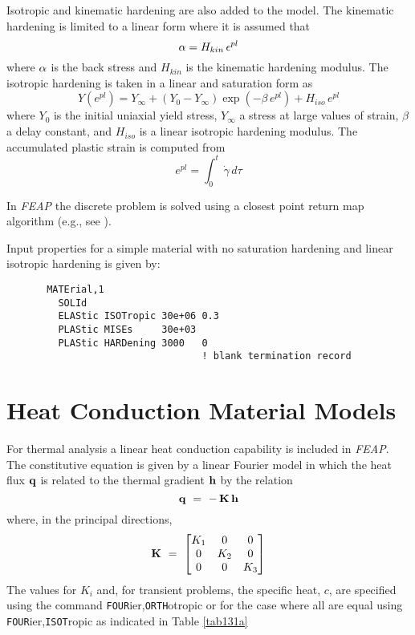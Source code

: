 Isotropic and kinematic hardening are also added to the model.  The kinematic
hardening is limited to a linear form where it is assumed that
\begin{equation}
\mathbf{\alpha} = H_{kin} \, \mathbf{\epsilon}^{pl}
\end{equation}
where $\mathbf{\alpha}$ is the back stress and $H_{kin}$ is the kinematic hardening
modulus.  The isotropic hardening is taken in a linear and saturation form
as
\begin{equation}
Y(e^{pl}) = Y_{\infty} + (Y_0 - Y_{\infty}) \exp (- \beta \, e^{pl})
+ H_{iso} \, e^{pl}
\end{equation}
where $Y_0$ is the initial uniaxial yield stress, $Y_{\infty}$ a stress
at large values of strain, $\beta$ a delay constant, and $H_{iso}$ is a linear
isotropic hardening modulus.  The accumulated plastic strain is computed
from
\begin{equation}
e^{pl} = \int_0^t \, \dot{\gamma} \, d \tau
\end{equation}

In {\sl FEAP} the discrete problem is solved using a closest point return
map algorithm (e.g., see \cite{simort85,simort86,simo:hughes}).

Input properties for a simple material with no saturation hardening and
linear isotropic hardening is given by:
\begin{verbatim}
       MATErial,1
         SOLId
         ELAStic ISOTropic 30e+06 0.3
         PLAStic MISEs     30e+03
         PLAStic HARDening 3000   0
                                  ! blank termination record
\end{verbatim}

\section{Heat Conduction Material Models}
\label{heat}

For thermal analysis a linear heat conduction capability is included in
{\sl FEAP}.  The constitutive equation is given by a linear Fourier
model in which the heat flux $\mathbf{q}$ is related to the thermal gradient $\mathbf{h}$
by the relation
\begin{equation}
\mathbf{q} ~=~ - \, \mathbf{K} \, \mathbf{h}
\end{equation}
where, in the principal directions,
\begin{equation}
\mathbf{K} ~=~ \left[ \begin{matrix}
K_1 & 0 & 0 \\
0 & K_2 & 0 \\
0 & 0 & K_3 \\
\end{matrix} \right]
\end{equation}
The values for $K_i$ and, for transient problems, the specific heat, $c$,
are specified using the command {\tt FOUR}\-ier,{\tt ORTH}o\-trop\-ic
or for the case where all are equal using {\tt FOUR}\-ier,{\tt ISOT}rop\-ic
as indicated in Table \ref{tab131a}

